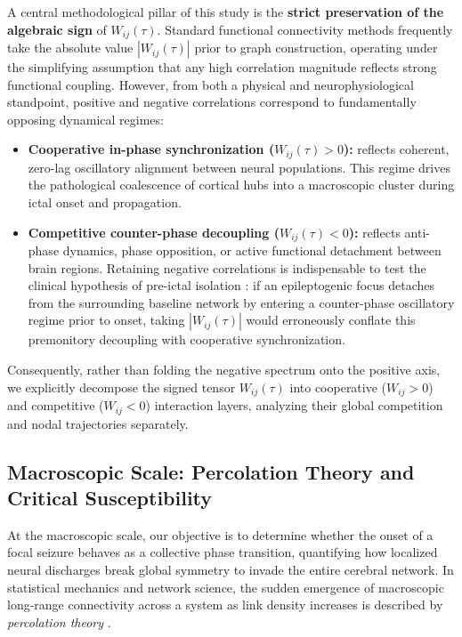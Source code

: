 A central methodological pillar of this study is the \textbf{strict preservation of the algebraic sign} of $W_{ij}(\tau)$. Standard functional connectivity methods frequently take the absolute value $|W_{ij}(\tau)|$ prior to graph construction, operating under the simplifying assumption that any high correlation magnitude reflects strong functional coupling. However, from both a physical and neurophysiological standpoint, positive and negative correlations correspond to fundamentally opposing dynamical regimes:
\begin{itemize}
    \item \textbf{Cooperative in-phase synchronization ($W_{ij}(\tau) > 0$):} reflects coherent, zero-lag oscillatory alignment between neural populations. This regime drives the pathological coalescence of cortical hubs into a macroscopic cluster during ictal onset and propagation.
    \item \textbf{Competitive counter-phase decoupling ($W_{ij}(\tau) < 0$):} reflects anti-phase dynamics, phase opposition, or active functional detachment between brain regions. Retaining negative correlations is indispensable to test the clinical hypothesis of pre-ictal isolation \cite{mormann2003epileptic, jiruska2013synchronization}: if an epileptogenic focus detaches from the surrounding baseline network by entering a counter-phase oscillatory regime prior to onset, taking $|W_{ij}(\tau)|$ would erroneously conflate this premonitory decoupling with cooperative synchronization.
\end{itemize}
Consequently, rather than folding the negative spectrum onto the positive axis, we explicitly decompose the signed tensor $W_{ij}(\tau)$ into cooperative ($W_{ij} > 0$) and competitive ($W_{ij} < 0$) interaction layers, analyzing their global competition and nodal trajectories separately.

\subsection{Macroscopic Scale: Percolation Theory and Critical Susceptibility}
At the macroscopic scale, our objective is to determine whether the onset of a focal seizure behaves as a collective phase transition, quantifying how localized neural discharges break global symmetry to invade the entire cerebral network. In statistical mechanics and network science, the sudden emergence of macroscopic long-range connectivity across a system as link density increases is described by \textit{percolation theory} \cite{newman2018networks, barabasi2016network}.

